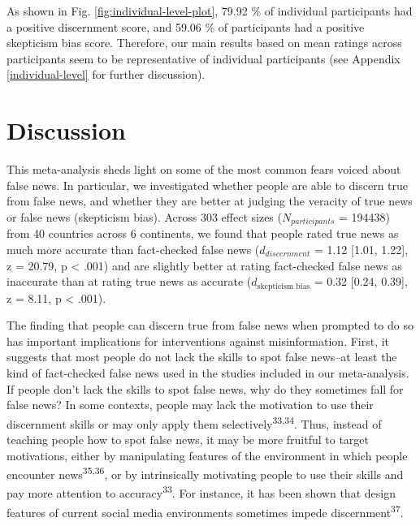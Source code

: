 \documentclass[
  man]{apa6}
\begin{document}
As shown in Fig. \ref{fig:individual-level-plot}, 79.92 \% of individual participants had a positive discernment score, and 59.06 \% of participants had a positive skepticism bias score. Therefore, our main results based on mean ratings across participants seem to be representative of individual participants (see Appendix \ref{individual-level} for further discussion).

\section{Discussion}\label{discussion}

This meta-analysis sheds light on some of the most common fears voiced about false news. In particular, we investigated whether people are able to discern true from false news, and whether they are better at judging the veracity of true news or false news (skepticism bias). Across 303 effect sizes (\(N_{participants}\) = 194438) from 40 countries across 6 continents, we found that people rated true news as much more accurate than fact-checked false news (\(d_{discernment}\) = 1.12 {[}1.01, 1.22{]}, z = 20.79, p \textless{} .001) and are slightly better at rating fact-checked false news as inaccurate than at rating true news as accurate (\(d_{\text{skepticism bias}}\) = 0.32 {[}0.24, 0.39{]}, z = 8.11, p \textless{} .001).

The finding that people can discern true from false news when prompted to do so has important implications for interventions against misinformation. First, it suggests that most people do not lack the skills to spot false news--at least the kind of fact-checked false news used in the studies included in our meta-analysis. If people don't lack the skills to spot false news, why do they sometimes fall for false news? In some contexts, people may lack the motivation to use their discernment skills or may only apply them selectively\textsuperscript{33,34}. Thus, instead of teaching people how to spot false news, it may be more fruitful to target motivations, either by manipulating features of the environment in which people encounter news\textsuperscript{35,36}, or by intrinsically motivating people to use their skills and pay more attention to accuracy\textsuperscript{33}. For instance, it has been shown that design features of current social media environments sometimes impede discernment\textsuperscript{37}.
\end{document}
